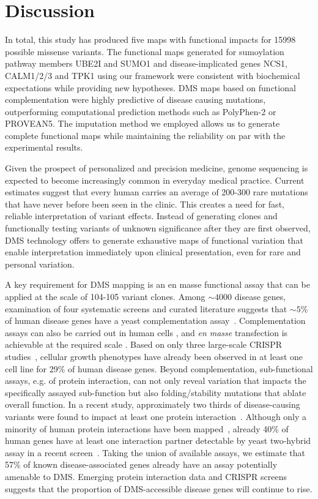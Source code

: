\section{Discussion}

In total, this study has produced five maps with functional impacts for 15998 possible missense variants. The functional maps generated for sumoylation pathway members UBE2I and SUMO1 and disease-implicated genes NCS1, CALM1/2/3 and TPK1 using our framework were consistent with biochemical expectations while providing new hypotheses. DMS maps based on functional complementation were highly predictive of disease causing mutations, outperforming computational prediction methods such as PolyPhen-2 or PROVEAN5.  The imputation method we employed allows us to generate complete functional maps while maintaining the reliability on par with the experimental results. 

Given the prospect of personalized and precision medicine, genome sequencing is expected to become increasingly common in everyday medical practice. Current estimates suggest that every human carries an average of 200-300 rare mutations that have never before been seen in the clinic. This creates a need for fast, reliable interpretation of variant effects. Instead of generating clones and functionally testing variants of unknown significance after they are first observed, DMS technology offers to generate exhaustive maps of functional variation that enable interpretation immediately upon clinical presentation, even for rare and personal variation.

A key requirement for DMS mapping is an en masse functional assay that can be applied at the scale of 104-105 variant clones.  Among $\sim 4000$ disease genes, examination of four systematic screens and curated literature suggests that $\sim 5\%$ of human disease genes have a yeast complementation assay~\cite{5,33,34}. Complementation assays can also be carried out in human cells , and \textit{en masse} transfection is achievable at the required scale . Based on only three large-scale CRISPR studies~\cite{35-37}, cellular growth phenotypes have already been observed in at least one cell line for 29\% of human disease genes.  Beyond complementation, sub-functional assays, e.g. of protein interaction, can not only reveal variation that impacts the specifically assayed sub-function but also folding/stability mutations that ablate overall function. In a recent study, approximately two thirds of disease-causing variants were found to impact at least one protein interaction~\cite{38}. Although only a minority of human protein interactions have been mapped~\cite{39}, already 40\% of human genes have at least one interaction partner detectable by yeast two-hybrid assay in a recent screen~\cite{39}. Taking the union of available assays, we estimate that 57\% of known disease-associated genes already have an assay potentially amenable to DMS. Emerging protein interaction data and CRISPR screens suggests that the proportion of DMS-accessible disease genes will continue to rise. 

